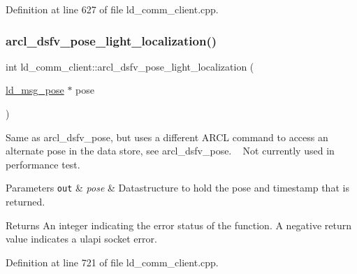 Definition at line 627 of file ld\+\_\+comm\+\_\+client.\+cpp.

\mbox{\label{classld__comm__client_a513a0bddf7967271eb3ba45d50f47fe6}} 
\subsubsection{\texorpdfstring{arcl\+\_\+dsfv\+\_\+pose\+\_\+light\+\_\+localization()}{arcl\_dsfv\_pose\_light\_localization()}}
{\footnotesize\ttfamily int ld\+\_\+comm\+\_\+client\+::arcl\+\_\+dsfv\+\_\+pose\+\_\+light\+\_\+localization (\begin{DoxyParamCaption}\item[{\mbox{\hyperlink{structld__msg__pose}{ld\+\_\+msg\+\_\+pose}} $\ast$}]{pose }\end{DoxyParamCaption})}

Same as arcl\+\_\+dsfv\+\_\+pose, but uses a different A\+R\+CL command to access an alternate pose in the data store, see arcl\+\_\+dsfv\+\_\+pose. ~\newline
Not currently used in performance test. 
\begin{DoxyParams}[1]{Parameters}
\mbox{\tt out}  & {\em pose} & Datastructure to hold the pose and timestamp that is returned. \\
\hline
\end{DoxyParams}
\begin{DoxyReturn}{Returns}
An integer indicating the error status of the function. A negative return value indicates a ulapi socket error. 
\end{DoxyReturn}


Definition at line 721 of file ld\+\_\+comm\+\_\+client.\+cpp.

\mbox{\label{classld__comm__client_a9c0159e1ab1f6112e4ee9e14e2ae4975}} 
